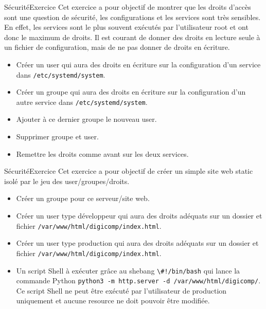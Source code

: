\documentclass{beamer}
\begin{document}
    \begin{frame}{Sécurité}{Exercice \execcounterdispinc}
        Cet exercice a pour objectif de montrer que les droits d'accès sont une question de sécurité, les configurations et les services sont très sensibles.
        En effet, les services sont le plus souvent exécutés par l'utilisateur root et ont donc le maximum de droits.
        \bigbreak
        Il est courant de donner des droits en lecture seule à un fichier de configuration, mais de ne pas donner de droits en écriture.
        \begin{itemize}
            \item Créer un user qui aura des droits en écriture sur la configuration d'un service dans \lstinline{/etc/systemd/system}.
            \item Créer un groupe qui aura des droits en écriture sur la configuration d'un autre service dans \lstinline{/etc/systemd/system}.
            \item Ajouter à ce dernier groupe le nouveau user.
            \item Supprimer groupe et user.
            \item Remettre les droits comme avant sur les deux services.
        \end{itemize}
    \end{frame}

    \begin{frame}{Sécurité}{Exercice \execcounterdispinc}
        Cet exercice a pour objectif de créer un simple site web static isolé par le jeu des user/groupes/droits.
        \begin{itemize}
            \item Créer un groupe pour ce serveur/site web.
            \item Créer un user type développeur qui aura des droits adéquats sur un dossier et fichier \lstinline{/var/www/html/digicomp/index.html}.
            \item Créer un user type production qui aura des droits adéquats sur un dossier et fichier \lstinline{/var/www/html/digicomp/index.html}.
            \item Un script Shell à exécuter grâce au shebang \lstinline{\#!/bin/bash} qui lance la commande Python \lstinline{python3 -m http.server -d /var/www/html/digicomp/}.
            Ce script Shell ne peut être exécuté par l'utilisateur de production uniquement et aucune resource ne doit pouvoir être modifiée.
        \end{itemize}
    \end{frame}
\end{document}

